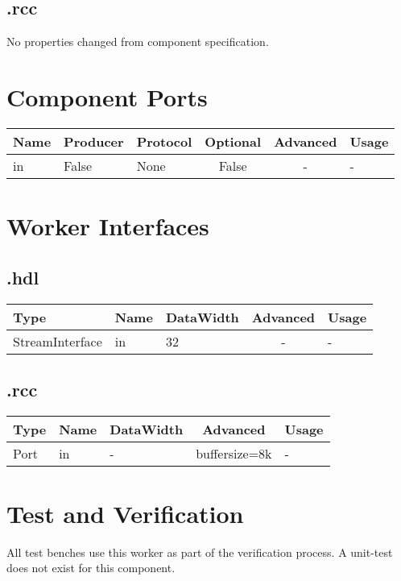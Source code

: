 \begin{landscape}
	\subsection*{\comp.rcc}
	\begin{scriptsize}
    No properties changed from component specification.
	\end{scriptsize}

	\section*{Component Ports}
	\begin{scriptsize}
\begin{tabular}{|M{2cm}|M{1.5cm}|M{4cm}|c|c|M{9cm}|}
\hline
{}
Name & Producer & Protocol & Optional & Advanced & Usage
\\
\hline
in & False & None& False & - & -\\
\hline
\end{tabular}
	\end{scriptsize}

	\section*{Worker Interfaces}
	\subsection*{\comp.hdl}
	\begin{scriptsize}
\begin{tabular}{|M{2cm}|M{1.5cm}|M{4cm}|c|M{12cm}|}
\hline
{}
Type & Name & DataWidth & Advanced & Usage
\\
\hline
StreamInterface & in & 32 & - & -\\
\hline
\end{tabular}
	\end{scriptsize}

	\subsection*{\comp.rcc}
	\begin{scriptsize}
\begin{tabular}{|M{2cm}|M{1.5cm}|M{4cm}|c|M{12cm}|}
\hline
{}
Type & Name & DataWidth & Advanced & Usage
\\
\hline
Port & in & - & buffersize=8k & -\\
\hline
\end{tabular}
	\end{scriptsize}
\end{landscape}

\section*{Test and Verification}
\begin{flushleft}
All test benches use this worker as part of the verification process. A unit-test does not exist for this component.
\end{flushleft}

